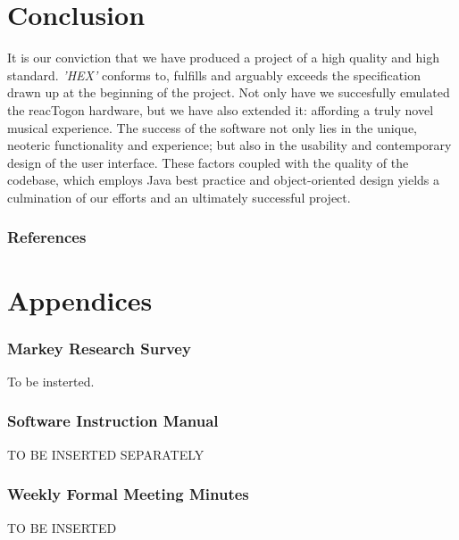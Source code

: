 \documentclass[10pt,a4paper]{article}
\begin{document}
\part{Conclusion}
It is our conviction that we have produced a project of a high quality and high standard. \textit{'HEX'} conforms to, fulfills and arguably exceeds the specification drawn up at the beginning of the project. Not only have we succesfully emulated the reacTogon hardware, but we have also extended it: affording a truly novel musical experience. The success of the software not only lies in the unique, neoteric functionality and experience; but also in the usability and contemporary design of the user interface. These factors coupled with the quality of the codebase, which employs Java best practice and object-oriented design yields a culmination of our efforts and an ultimately successful project.

\section{References}
\pagebreak

\part{Appendices}



\section{Markey Research Survey}
To be insterted.

\pagebreak
\section{Software Instruction Manual}
TO BE INSERTED SEPARATELY

\pagebreak
\section{Weekly Formal Meeting Minutes}
TO BE INSERTED
\end{document}

